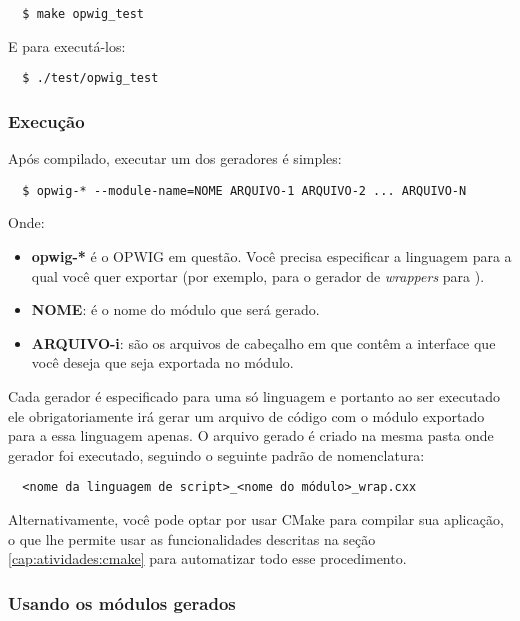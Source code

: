 \begin{verbatim}
  $ make opwig_test
\end{verbatim}

E para executá-los:

\begin{verbatim}
  $ ./test/opwig_test
\end{verbatim}

\subsubsection{Execução}

Após compilado, executar um dos geradores é simples:
\begin{verbatim}
  $ opwig-* --module-name=NOME ARQUIVO-1 ARQUIVO-2 ... ARQUIVO-N
\end{verbatim}

Onde:
\begin{itemize}
  \item \textbf{opwig-*} é o OPWIG em questão. Você precisa especificar a
        linguagem para a qual você quer exportar (por exemplo, 
        para o gerador de \textit{wrappers} para ).
  \item \textbf{NOME}: é o nome do módulo que será gerado.
  \item \textbf{ARQUIVO-i}: são os arquivos de cabeçalho em \CXX{} que contêm a interface
        que você deseja que seja exportada no módulo.
\end{itemize}

Cada gerador é especificado para uma só linguagem e portanto ao ser executado
ele obrigatoriamente irá gerar um arquivo de código com o módulo exportado para a
essa linguagem apenas. O arquivo gerado é criado na mesma pasta onde gerador foi
executado, seguindo o seguinte padrão de nomenclatura:
\begin{verbatim}
  <nome da linguagem de script>_<nome do módulo>_wrap.cxx
\end{verbatim}

Alternativamente, você pode optar por usar CMake para compilar sua aplicação, o que
lhe permite usar as funcionalidades descritas na seção \ref{cap:atividades:cmake}
para automatizar todo esse procedimento.

\subsubsection{Usando os módulos gerados}

